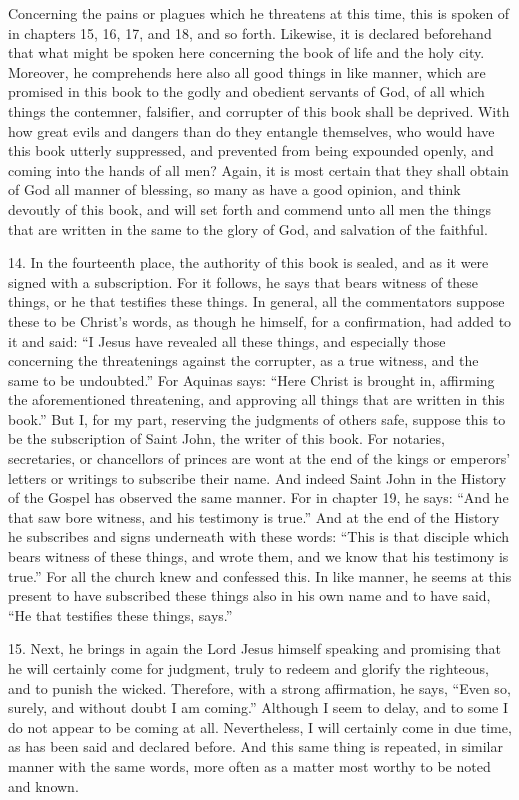 Concerning the pains or plagues which he threatens at this time, this is spoken of in chapters 15, 16, 17, and 18, and so forth. Likewise, it is declared beforehand that what might be spoken here concerning the book of life and the holy city. Moreover, he comprehends here also all good things in like manner, which are promised in this book to the godly and obedient servants of God, of all which things the contemner, falsifier, and corrupter of this book shall be deprived. With how great evils and dangers than do they entangle themselves, who would have this book utterly suppressed, and prevented from being expounded openly, and coming into the hands of all men? Again, it is most certain that they shall obtain of God all manner of blessing, so many as have a good opinion, and think devoutly of this book, and will set forth and commend unto all men the things that are written in the same to the glory of God, and salvation of the faithful.

14. In the fourteenth place, the authority of this book is sealed, and as it were signed with a subscription. For it follows, he says that bears witness of these things, or he that testifies these things. In general, all the commentators suppose these to be Christ’s words, as though he himself, for a confirmation, had added to it and said: “I Jesus have revealed all these things, and especially those concerning the threatenings against the corrupter, as a true witness, and the same to be undoubted.” For Aquinas says: “Here Christ is brought in, affirming the aforementioned threatening, and approving all things that are written in this book.” But I, for my part, reserving the judgments of others safe, suppose this to be the subscription of Saint John, the writer of this book. For notaries, secretaries, or chancellors of princes are wont at the end of the kings or emperors’ letters or writings to subscribe their name. And indeed Saint John in the History of the Gospel has observed the same manner. For in chapter 19, he says: “And he that saw bore witness, and his testimony is true.” And at the end of the History he subscribes and signs underneath with these words: “This is that disciple which bears witness of these things, and wrote them, and we know that his testimony is true.” For all the church knew and confessed this. In like manner, he seems at this present to have subscribed these things also in his own name and to have said, “He that testifies these things, says.”

15. Next, he brings in again the Lord Jesus himself speaking and promising that he will certainly come for judgment, truly to redeem and glorify the righteous, and to punish the wicked. Therefore, with a strong affirmation, he says, “Even so, surely, and without doubt I am coming.” Although I seem to delay, and to some I do not appear to be coming at all. Nevertheless, I will certainly come in due time, as has been said and declared before. And this same thing is repeated, in similar manner with the same words, more often as a matter most worthy to be noted and known.

